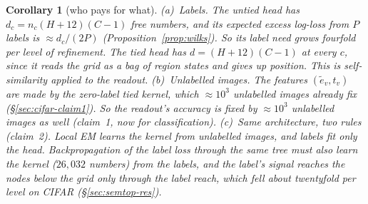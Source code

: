 \documentclass[11pt]{article}
\newtheorem{corollary}[theorem]{Corollary}
\theoremstyle{definition}
\begin{document}
\begin{corollary}[who pays for what]\label{cor:gridcost}
(a)~\emph{Labels.} The untied head has $d_c=n_c(H+12)(C-1)$ free numbers, and its expected excess log-loss from $P$ labels is
$\approx d_c/(2P)$ (Proposition~\ref{prop:wilks}). So its label need grows fourfold per level of refinement. The tied head has
$d=(H+12)(C-1)$ at every $c$, since it reads the grid as a bag of region states and gives up position. This is
self-similarity applied to the readout.
(b)~\emph{Unlabelled images.} The features $(\tilde e_v,t_v)$ are made by the zero-label tied kernel, which $\approx10^3$
unlabelled images already fix (\S\ref{sec:cifar-claim1}). So the readout's accuracy is fixed by $\approx10^3$ unlabelled images
as well (claim~1, now for classification).
(c)~\emph{Same architecture, two rules} (claim~2). Local EM learns the kernel from unlabelled images, and labels fit only
the head. Backpropagation of the label loss through the same tree must also learn the kernel ($26{,}032$ numbers) from the
labels, and the label's signal reaches the nodes below the grid only through the label reach, which fell about twentyfold per
level on CIFAR (\S\ref{sec:semtop-res}).
\end{corollary}
\end{document}
